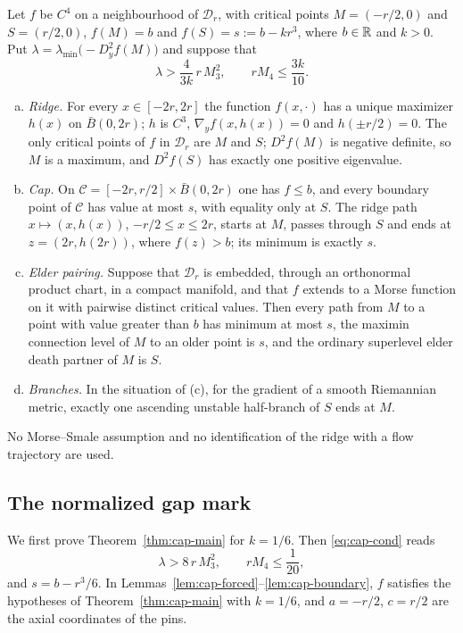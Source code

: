 \begin{theorem}\label{thm:cap-main}
Let $f$ be $C^4$ on a neighbourhood of $\mathcal D_r$, with critical points $M=(-r/2,0)$ and $S=(r/2,0)$, $f(M)=b$ and $f(S)=s:=b-kr^3$, where $b\in\mathbb R$ and $k>0$. Put $\lambda=\lambda_{\min}\bigl(-D_y^2f(M)\bigr)$ and suppose that
\begin{equation}\label{eq:cap-cond}
\lambda>\frac4{3k}\,r\,M_3^2,\qquad rM_4\le\frac{3k}{10}.
\end{equation}
\begin{enumerate}[(a),leftmargin=2em]
\item \emph{Ridge.} For every $x\in[-2r,2r]$ the function $f(x,\cdot)$ has a unique maximizer $h(x)$ on $\bar B(0,2r)$; $h$ is $C^3$, $\nabla_yf(x,h(x))=0$ and $h(\pm r/2)=0$. The only critical points of $f$ in $\mathcal D_r$ are $M$ and $S$; $D^2f(M)$ is negative definite, so $M$ is a maximum, and $D^2f(S)$ has exactly one positive eigenvalue.
\item \emph{Cap.} On $\mathcal C=[-2r,r/2]\times\bar B(0,2r)$ one has $f\le b$, and every boundary point of $\mathcal C$ has value at most $s$, with equality only at $S$. The ridge path $x\mapsto(x,h(x))$, $-r/2\le x\le2r$, starts at $M$, passes through $S$ and ends at $z=(2r,h(2r))$, where $f(z)>b$; its minimum is exactly $s$.
\item \emph{Elder pairing.} Suppose that $\mathcal D_r$ is embedded, through an orthonormal product chart, in a compact manifold, and that $f$ extends to a Morse function on it with pairwise distinct critical values. Then every path from $M$ to a point with value greater than $b$ has minimum at most $s$, the maximin connection level of $M$ to an older point is $s$, and the ordinary superlevel elder death partner of $M$ is $S$.
\item \emph{Branches.} In the situation of \textup{(c)}, for the gradient of a smooth Riemannian metric, exactly one ascending unstable half-branch of $S$ ends at $M$.
\end{enumerate}
No Morse--Smale assumption and no identification of the ridge with a flow trajectory are used.
\end{theorem}

\subsection{The normalized gap mark}\label{ssec:cap-normalized}

We first prove Theorem~\ref{thm:cap-main} for $k=1/6$. Then \eqref{eq:cap-cond} reads
\begin{equation}\label{eq:cap-cond6}
\lambda>8\,r\,M_3^2,\qquad rM_4\le\frac1{20},
\end{equation}
and $s=b-r^3/6$. In Lemmas~\ref{lem:cap-forced}--\ref{lem:cap-boundary}, $f$ satisfies the hypotheses of Theorem~\ref{thm:cap-main} with $k=1/6$, and $a=-r/2$, $c=r/2$ are the axial coordinates of the pins.

